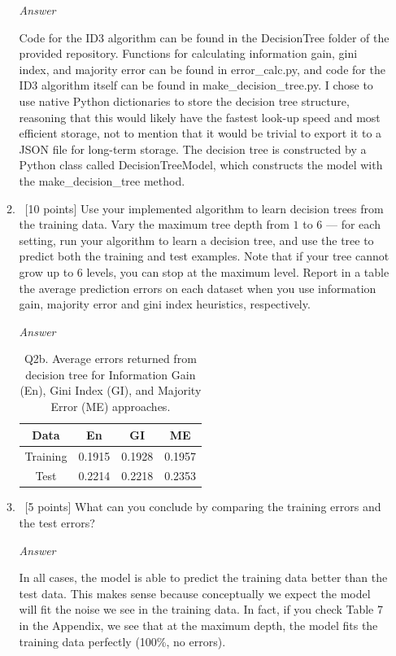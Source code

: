 \documentclass[12pt, fullpage,letterpaper]{article}
\begin{document}
\begin{enumerate}
\begin{enumerate}
\emph{Answer}

Code for the ID3 algorithm can be found in the DecisionTree folder of the provided repository. Functions for calculating information gain, gini index, and majority error can be found in error\_calc.py, and code for the ID3 algorithm itself can be found in make\_decision\_tree.py. I chose to use native Python dictionaries to store the decision tree structure, reasoning that this would likely have the fastest look-up speed and most efficient storage, not to mention that it would be trivial to export it to a JSON file for long-term storage. The decision tree is constructed by a Python class called DecisionTreeModel, which constructs the model with the make\_decision\_tree method.

\item~[10 points] Use your implemented algorithm to learn decision trees from the training data. Vary the maximum  tree depth from $1$ to $6$  --- for each setting, run your algorithm to learn a decision tree, and use the tree to  predict both the training  and test examples. Note that if your tree cannot grow up to 6 levels, you can stop at the maximum level. Report in a table the average prediction errors on each dataset when you use information gain, majority error and gini index heuristics, respectively.

\emph{Answer}

\begin{table}[h]
	\centering
	\begin{tabular}{c|ccc}
		Data & En & GI & ME \\ 
		\hline\hline
		Training &  0.1915 & 0.1928 & 0.1957 \\ \hline
		Test &  0.2214 & 0.2218 & 0.2353 \\ \hline
	\end{tabular}
	\caption{Q2b. Average errors returned from decision tree for Information Gain (En), Gini Index (GI), and Majority Error (ME) approaches.}
\end{table}

\item~[5 points] What can you conclude by comparing the training errors and the test errors?

\emph{Answer}

In all cases, the model is able to predict the training data better than the test data. This makes sense because conceptually we expect the model will fit the noise we see in the training data. In fact, if you check Table 7 in the Appendix, we see that at the maximum depth, the model fits the training data perfectly (100\%, no errors).


\end{enumerate}
\end{enumerate}
\end{document}
